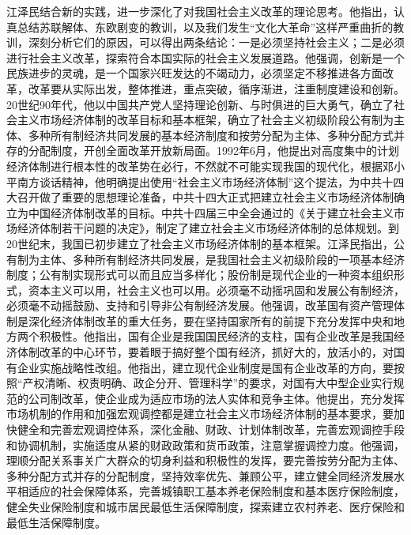\documentclass[UTF8, 11pt, oneside]{ctexart}
\begin{document}
江泽民结合新的实践，进一步深化了对我国社会主义改革的理论思考。他指出，认真总结苏联解体、东欧剧变的教训，以及我们发生“文化大革命”这样严重曲折的教训，深刻分析它们的原因，可以得出两条结论：一是必须坚持社会主义；二是必须进行社会主义改革，探索符合本国实际的社会主义发展道路。他强调，创新是一个民族进步的灵魂，是一个国家兴旺发达的不竭动力，必须坚定不移推进各方面改革，改革要从实际出发，整体推进，重点突破，循序渐进，注重制度建设和创新。20世纪90年代，他以中国共产党人坚持理论创新、与时俱进的巨大勇气，确立了社会主义市场经济体制的改革目标和基本框架，确立了社会主义初级阶段公有制为主体、多种所有制经济共同发展的基本经济制度和按劳分配为主体、多种分配方式并存的分配制度，开创全面改革开放新局面。1992年6月，他提出对高度集中的计划经济体制进行根本性的改革势在必行，不然就不可能实现我国的现代化，根据邓小平南方谈话精神，他明确提出使用“社会主义市场经济体制”这个提法，为中共十四大召开做了重要的思想理论准备，中共十四大正式把建立社会主义市场经济体制确立为中国经济体制改革的目标。中共十四届三中全会通过的《关于建立社会主义市场经济体制若干问题的决定》，制定了建立社会主义市场经济体制的总体规划。到20世纪末，我国已初步建立了社会主义市场经济体制的基本框架。江泽民指出，公有制为主体、多种所有制经济共同发展，是我国社会主义初级阶段的一项基本经济制度；公有制实现形式可以而且应当多样化；股份制是现代企业的一种资本组织形式，资本主义可以用，社会主义也可以用。必须毫不动摇巩固和发展公有制经济，必须毫不动摇鼓励、支持和引导非公有制经济发展。他强调，改革国有资产管理体制是深化经济体制改革的重大任务，要在坚持国家所有的前提下充分发挥中央和地方两个积极性。他指出，国有企业是我国国民经济的支柱，国有企业改革是我国经济体制改革的中心环节，要着眼于搞好整个国有经济，抓好大的，放活小的，对国有企业实施战略性改组。他指出，建立现代企业制度是国有企业改革的方向，要按照“产权清晰、权责明确、政企分开、管理科学”的要求，对国有大中型企业实行规范的公司制改革，使企业成为适应市场的法人实体和竞争主体。他提出，充分发挥市场机制的作用和加强宏观调控都是建立社会主义市场经济体制的基本要求，要加快健全和完善宏观调控体系，深化金融、财政、计划体制改革，完善宏观调控手段和协调机制，实施适度从紧的财政政策和货币政策，注意掌握调控力度。他强调，理顺分配关系事关广大群众的切身利益和积极性的发挥，要完善按劳分配为主体、多种分配方式并存的分配制度，坚持效率优先、兼顾公平，建立健全同经济发展水平相适应的社会保障体系，完善城镇职工基本养老保险制度和基本医疗保险制度，健全失业保险制度和城市居民最低生活保障制度，探索建立农村养老、医疗保险和最低生活保障制度。
\end{document}
